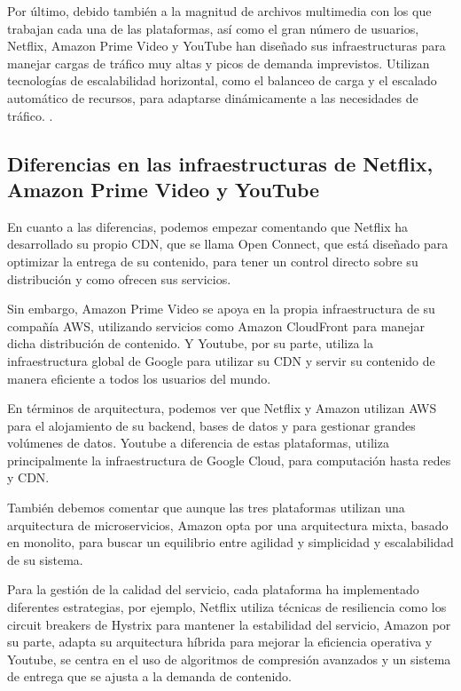 \documentclass[12pt,a4paper]{article}
\begin{document}
Por último, debido también a la magnitud de archivos multimedia con los que trabajan cada una de las plataformas, así como el gran número de usuarios, Netflix, Amazon Prime Video y YouTube han diseñado sus infraestructuras para manejar cargas de tráfico muy altas y picos de demanda imprevistos. Utilizan tecnologías de escalabilidad horizontal, como el balanceo de carga y el escalado automático de recursos, para adaptarse dinámicamente a las necesidades de tráfico. \cite{suman2022}.

\newpage


\subsection{Diferencias en las infraestructuras de Netflix, Amazon Prime Video y YouTube}

En cuanto a las diferencias, podemos empezar comentando que Netflix ha desarrollado su propio CDN, que se llama Open Connect, que está diseñado para optimizar la entrega de su contenido, para tener un control directo sobre su distribución y como ofrecen sus servicios.

Sin embargo, Amazon Prime Video se apoya en la propia infraestructura de su compañía AWS, utilizando servicios como Amazon CloudFront para manejar dicha distribución de contenido. Y Youtube, por su parte, utiliza la infraestructura global de Google para utilizar su CDN y servir su contenido de manera eficiente a todos los usuarios del mundo.

En términos de arquitectura, podemos ver que Netflix y Amazon utilizan AWS para el alojamiento de su backend, bases de datos y para gestionar grandes volúmenes de datos. Youtube a diferencia de estas plataformas,  utiliza principalmente la infraestructura de Google Cloud, para computación hasta redes y CDN. 

También debemos comentar que aunque las tres plataformas utilizan una arquitectura de microservicios, Amazon opta por una arquitectura mixta, basado en monolito, para buscar un equilibrio entre agilidad y simplicidad y escalabilidad de su sistema. 

Para la gestión de la calidad del servicio, cada plataforma ha implementado diferentes estrategias, por ejemplo, Netflix utiliza técnicas de resiliencia como los circuit breakers de Hystrix para mantener la estabilidad del servicio, Amazon por su parte, adapta su arquitectura híbrida para mejorar la eficiencia operativa y Youtube, se centra en el uso de algoritmos de compresión avanzados y un sistema de entrega que se ajusta a la demanda de contenido.
\end{document}
